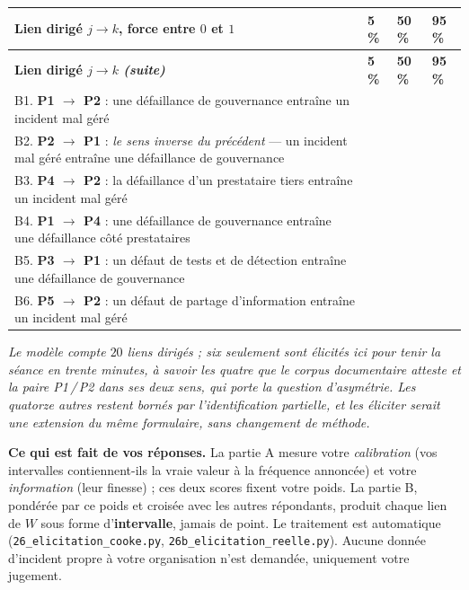 \documentclass[11pt,a4paper]{article}
\begin{document}
\vspace{0.2cm}
\begin{longtable}{|p{9.6cm}|A|A|A|}
\hline
{}
\textbf{Lien dirigé $j \to k$, force entre $0$ et $1$} & \textbf{5\,\%} & \textbf{50\,\%} & \textbf{95\,\%} \\ \hline
\endfirsthead
\hline
{}
\textbf{Lien dirigé $j \to k$ \emph{(suite)}} & \textbf{5\,\%} & \textbf{50\,\%} & \textbf{95\,\%} \\ \hline
\endhead
B1. \textbf{P1 $\to$ P2} : une défaillance de gouvernance entraîne un incident mal géré & & & \\ \hline
B2. \textbf{P2 $\to$ P1} : \emph{le sens inverse du précédent} --- un incident mal géré entraîne une défaillance de gouvernance & & & \\ \hline
B3. \textbf{P4 $\to$ P2} : la défaillance d'un prestataire tiers entraîne un incident mal géré & & & \\ \hline
B4. \textbf{P1 $\to$ P4} : une défaillance de gouvernance entraîne une défaillance côté prestataires & & & \\ \hline
B5. \textbf{P3 $\to$ P1} : un défaut de tests et de détection entraîne une défaillance de gouvernance & & & \\ \hline
B6. \textbf{P5 $\to$ P2} : un défaut de partage d'information entraîne un incident mal géré & & & \\ \hline
\end{longtable}

\vspace{0.05cm}
\footnotesize\emph{Le modèle compte $20$ liens dirigés ; six seulement sont élicités ici pour
tenir la séance en trente minutes, à savoir les quatre que le corpus documentaire atteste et la
paire P1\,/\,P2 dans ses deux sens, qui porte la question d'asymétrie. Les quatorze autres
restent bornés par l'identification partielle, et les éliciter serait une extension du même
formulaire, sans changement de méthode.}
\normalsize

\vspace{0.18cm}
\begin{cle}
\textbf{Ce qui est fait de vos réponses.} La partie A mesure votre \emph{calibration} (vos
intervalles contiennent-ils la vraie valeur à la fréquence annoncée) et votre \emph{information}
(leur finesse) ; ces deux scores fixent votre poids. La partie B, pondérée par ce poids et
croisée avec les autres répondants, produit chaque lien de $W$ sous forme d'\textbf{intervalle},
jamais de point. Le traitement est automatique (\texttt{26\_elicitation\_cooke.py},
\texttt{26b\_elicitation\_reelle.py}). Aucune donnée d'incident propre à votre organisation
n'est demandée, uniquement votre jugement.
\end{cle}
\end{document}
